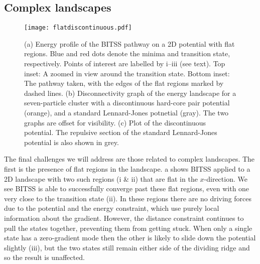 \documentclass[twocolumn,10pt]{revtex4-2}
\begin{document}
\subsection{Complex landscapes}
\begin{figure}[tb]
  \texttt{[image: flatdiscontinuous.pdf]}
  \caption{\label{fig:flatdiscontinuous}
    (a) Energy profile of the BITSS pathway on a 2D potential with flat regions.
        Blue and red dots denote the minima and transition state, respectively.
        Points of interest are labelled by i--iii (see text).
        Top inset: A zoomed in view around the transition state.
        Bottom inset: The pathway taken, with the edges of the flat regions marked by dashed lines.
    (b) Disconnectivity graph of the energy landscape for a seven-particle cluster with a discontinuous hard-core pair potential (orange), and a standard Lennard-Jones potnetial (gray).
        The two graphs are offset for visibility.
    (c) Plot of the discontinuous potential.
        The repulsive section of the standard Lennard-Jones potential is also shown in grey.
  }
\end{figure}

The final challenges we will address are those related to complex landscapes.
The first is the presence of flat regions in the landscape.
a shows BITSS applied to a 2D landscape with two such regions (i \& ii) that are flat in the $x$-direction.
We see BITSS is able to successfully converge past these flat regions, even with one very close to the transition state (ii).
In these regions there are no driving forces due to the potential and the energy constraint, which use purely local information about the gradient.
However, the distance constraint continues to pull the states together, preventing them from getting stuck.
When only a single state has a zero-gradient mode then the other is likely to slide down the potential slightly (iii), but the two states still remain either side of the dividing ridge and so the result is unaffected.
\end{document}

